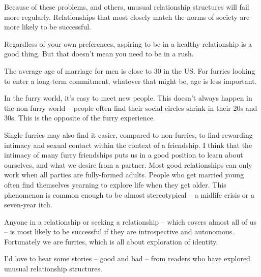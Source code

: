 Because of these problems, and others, unusual relationship structures will fail more regularly. Relationships that most closely match the norms of society are more likely to be successful.

Regardless of your own preferences, aspiring to be in a healthy relationship is a good thing. But that doesn't mean you need to be in a rush.

The average age of marriage for men is close to 30 in the US. For furries looking to enter a long-term commitment, whatever that might be, age is less important.

In the furry world, it's easy to meet new people. This doesn't always happen in the non-furry world -- people often find their social circles shrink in their 20s and 30s. This is the opposite of the furry experience.

Single furries may also find it easier, compared to non-furries, to find rewarding intimacy and sexual contact within the context of a friendship. I think that the intimacy of many furry friendships puts us in a good position to learn about ourselves, and what we desire from a partner. Most good relationships can only work when all parties are fully-formed adults. People who get married young often find themselves yearning to explore life when they get older. This phenomenon is common enough to be almost stereotypical -- a midlife crisis or a seven-year itch.

Anyone in a relationship or seeking a relationship -- which covers almost all of us -- is most likely to be successful if they are introspective and autonomous. Fortunately we are furries, which is all about exploration of identity.

I'd love to hear some stories -- good and bad -- from readers who have explored unusual relationship structures.
